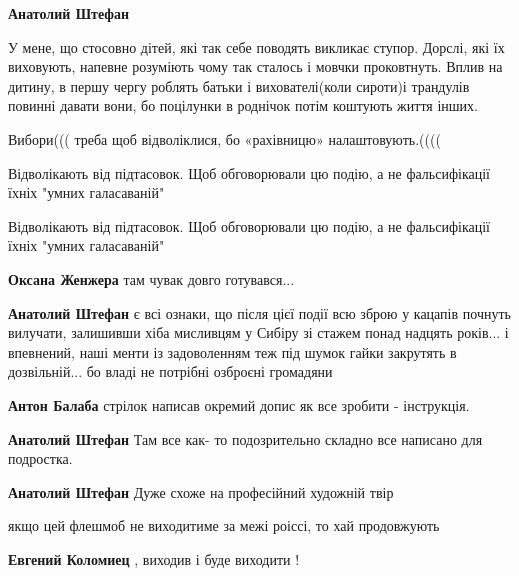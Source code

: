 \begin{itemize}
\begin{itemize}
\textbf{Анатолий Штефан} 

У мене, що стосовно дітей, які так себе поводять викликає ступор. Дорслі, які їх
виховують, напевне розуміють чому так сталось і мовчки проковтнуть. Вплив на
дитину, в першу чергу роблять батьки і вихователі(коли сироти)і трандулів
повинні давати вони, бо поцілунки в роднічок потім коштують життя інших.

\end{itemize} %

Вибори((( треба щоб відволіклися, бо «рахівницю» налаштовують.((((

Відволікають від підтасовок. Щоб обговорювали цю подію, а не фальсифікації їхніх "умних галасаваній"

Відволікають від підтасовок. Щоб обговорювали цю подію, а не фальсифікації їхніх "умних галасаваній"

\begin{itemize} %
\textbf{Оксана Женжера} там чувак довго готувався...

\textbf{Анатолий Штефан} є всі ознаки, що після цієї події всю зброю у кацапів почнуть вилучати, залишивши хіба мисливцям у Сибіру зі стажем понад надцять років... і впевнений, наші менти із задоволенням теж під шумок гайки закрутять в дозвільній... бо владі не потрібні озброєні громадяни


\textbf{Антон Балаба} стрілок написав окремий допис як все зробити - інструкція.

\textbf{Анатолий Штефан} Там все как- то подозрительно складно все написано для подростка.

\textbf{Анатолий Штефан} Дуже схоже на професійний художній твір
\end{itemize} %


якщо цей флешмоб не виходитиме за межі роіссі, то хай продовжують

\begin{itemize} %
\textbf{Евгений Коломиец} , виходив і буде виходити !
\end{itemize} %



\end{itemize}
